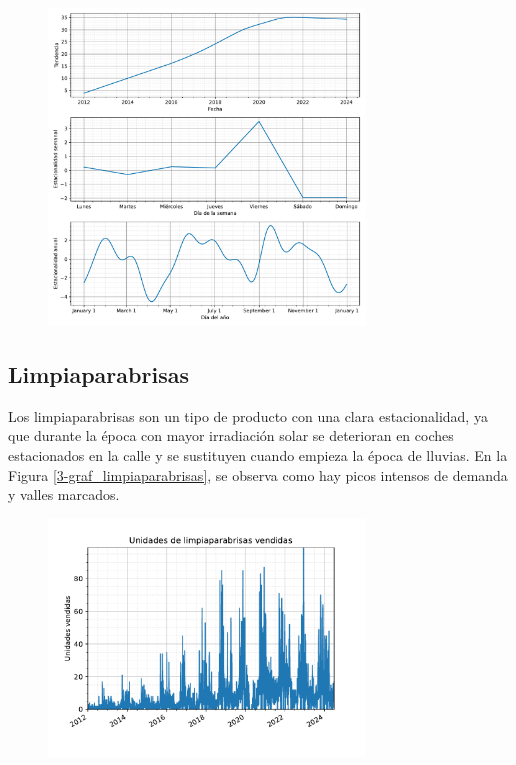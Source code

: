\begin{figure}[H]
	{\includegraphics[width=0.75\textwidth]{imagenes/comps_aceites.pdf}}
\end{figure}

\subsection{Limpiaparabrisas}

Los limpiaparabrisas son un tipo de producto con una clara estacionalidad, ya que durante la época con mayor irradiación solar se deterioran en coches estacionados en la calle y se sustituyen cuando empieza la época de lluvias. En la Figura \ref*{3-graf_limpiaparabrisas}, se observa como hay picos intensos de demanda y valles marcados.

\begin{figure}[H]
	{\includegraphics[width=0.75\textwidth]{imagenes/grafica_limpiaparabrisas.pdf}}
\end{figure}

